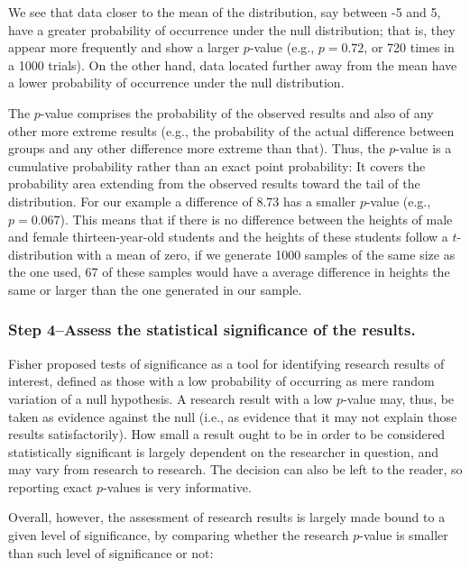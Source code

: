 \documentclass[
]{book}
\theoremstyle{definition}
\theoremstyle{definition}
\theoremstyle{definition}
\theoremstyle{definition}
\theoremstyle{remark}
\begin{document}
We see that data closer to the mean of the distribution, say between -5 and 5, have a greater probability of occurrence under the null distribution; that is, they appear more frequently and show a larger \(p\)-value (e.g., \(p = 0.72\), or 720 times in a 1000 trials). On the other hand, data located further away from the mean have a lower probability of occurrence under the null distribution.

The \(p\)-value comprises the probability of the observed results and also of any other more extreme results (e.g., the probability of the actual difference between groups and any other difference more extreme than that). Thus, the \(p\)-value is a cumulative probability rather than an exact point probability: It covers the probability area extending from the observed results toward the tail of the distribution. For our example a difference of 8.73 has a smaller \(p\)-value (e.g., \(p = 0.067\)). This means that if there is no difference between the heights of male and female thirteen-year-old students and the heights of these students follow a \(t\)-distribution with a mean of zero, if we generate 1000 samples of the same size as the one used, 67 of these samples would have a average difference in heights the same or larger than the one generated in our sample.

\hypertarget{step-4assess-the-statistical-significance-of-the-results.}{%
\subsubsection*{Step 4--Assess the statistical significance of the results.}\label{step-4assess-the-statistical-significance-of-the-results.}}

Fisher proposed tests of significance as a tool for identifying research results of interest, defined as those with a low probability of occurring as mere random variation of a null hypothesis. A research result with a low \(p\)-value may, thus, be taken as evidence against the null (i.e., as evidence that it may not explain those results satisfactorily). How small a result ought to be in order to be considered statistically significant is largely dependent on the researcher in question, and may vary from research to research. The decision can also be left to the reader, so reporting exact \(p\)-values is very informative.

Overall, however, the assessment of research results is largely made bound to a given level of significance, by comparing whether the research \(p\)-value is smaller than such level of significance or not:
\end{document}
